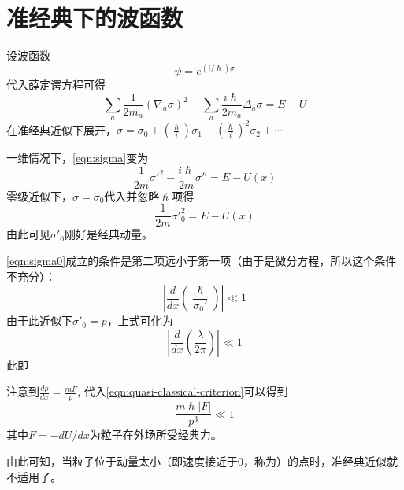 \documentclass[12pt, a4paper, oneside]{ctexbook}
\newcommand{\hl}[1]{\hlbox{#1}}
\newcounter{#2}
\newcounter{#2}[#1]
\numberwithin{#2}{#1}
\newcommand{\xkuo}[1]{\left(#1\right)}
\newcommand{\dao}[2]{\frac{d#1}{d#2}}
\begin{document}
            \section{准经典下的波函数}
            \begin{deduce}
              设波函数
              \begin{equation}\label{eqn:wavefun-sigma}
                \psi=e^{\xkuo{i/\hslash}\sigma}
              \end{equation}
              代入薛定谔方程可得
              \begin{equation}\label{eqn:sigma}
                \sum_a\frac{1}{2m_a}\xkuo{\nabla_a\sigma}^2-\sum_a\frac{i\hslash}{2m_a}\Delta_a\sigma=E-U
              \end{equation}
              在准经典近似下展开，\(\sigma=\sigma_0+\xkuo{\frac\hslash i}\sigma_1+\xkuo{\frac\hslash i}^2\sigma_2+\cdots\)
              
              一维情况下，\autoref{eqn:sigma}变为
              \begin{equation}
                \frac1{2m}\sigma'^2-\frac{i\hslash}{2m}\sigma''=E-U(x)
              \end{equation}
              零级近似下，\(\sigma=\sigma_0\)代入并忽略\(\hslash\)项得 
              \begin{equation}\label{eqn:sigma0}
                \frac{1}{2m}\sigma'^2_0=E-U(x)
              \end{equation}
              由此可见\(\sigma'_0\)刚好是经典动量。
            \end{deduce}
            \begin{define}
              \autoref{eqn:sigma0}成立的条件是第二项远小于第一项（由于是微分方程，所以这个条件不充分）：
              \begin{equation}\label{eqn:quasi-classical-criterion}
                \left|\dao{}{x}\xkuo{\frac{\hslash}{\sigma_0'}}\right|\ll1
              \end{equation}
              由于此近似下\(\sigma'_0=p\)，上式可化为
              \begin{equation}
                \left|\dao{}{x}\xkuo{\frac{\lambda}{2\pi}}\right|\ll1
              \end{equation}
              此即\hl{准经典条件}
            \end{define}
            \begin{deduce}
              注意到\(\dao px=\frac{mF}p\), 代入\autoref{eqn:quasi-classical-criterion}可以得到
              \begin{equation}
                \frac{m\hslash|F|}{p^3}\ll1
              \end{equation}
              其中\(F=-dU/dx\)为粒子在外场所受经典力。

              由此可知，当粒子位于动量太小（即速度接近于0，称为\hl{回点\label{concept:backpoint}}）的点时，准经典近似就不适用了。
            \end{deduce}
\end{document}
